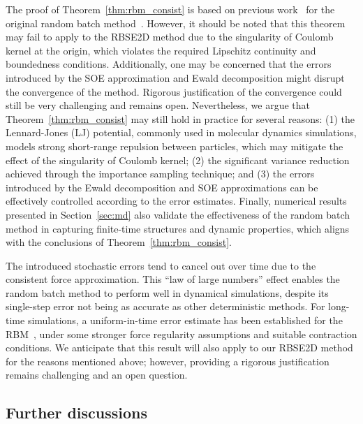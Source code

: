 The proof of Theorem~\ref{thm:rbm_consist} is based on previous work~\cite{jin2021convergence,Ye2023IMA} for the original random batch method~\cite{jin2020random}. However, it should be noted that this theorem may fail to apply to the RBSE2D method due to the singularity of Coulomb kernel at the origin, which violates the required Lipschitz continuity and boundedness conditions. 
Additionally, one may be concerned that the errors introduced by the SOE approximation and Ewald decomposition might disrupt the convergence of the method. 
Rigorous justification of the convergence could still be very challenging and remains open.
Nevertheless, we argue that Theorem~\ref{thm:rbm_consist} may still hold in practice for several reasons: (1) the Lennard-Jones (LJ) potential, commonly used in molecular dynamics simulations, models strong short-range repulsion between particles, which may mitigate the effect of the singularity of Coulomb kernel; (2) the significant variance reduction achieved through the importance sampling technique; and (3) the errors introduced by the Ewald decomposition and SOE approximations can be effectively controlled according to the error estimates. 
Finally, numerical results presented in Section~\ref{sec:md} also validate the effectiveness of the random batch method in capturing finite-time structures and dynamic properties, which aligns with the conclusions of Theorem~\ref{thm:rbm_consist}.


The introduced stochastic errors tend to cancel out over time due to the consistent force approximation. This ``law of large numbers'' effect enables the random batch method to perform well in dynamical simulations, despite its single-step error not being as accurate as other deterministic methods. 
For long-time simulations, a uniform-in-time error estimate has been established for the RBM~\cite{Jin2022MMS}, under some stronger force regularity assumptions and suitable contraction conditions. 
We anticipate that this result will also apply to our RBSE2D method for the reasons mentioned above; however, providing a rigorous justification remains challenging and an open question.

\subsection{Further discussions} \label{subsec::conv}


